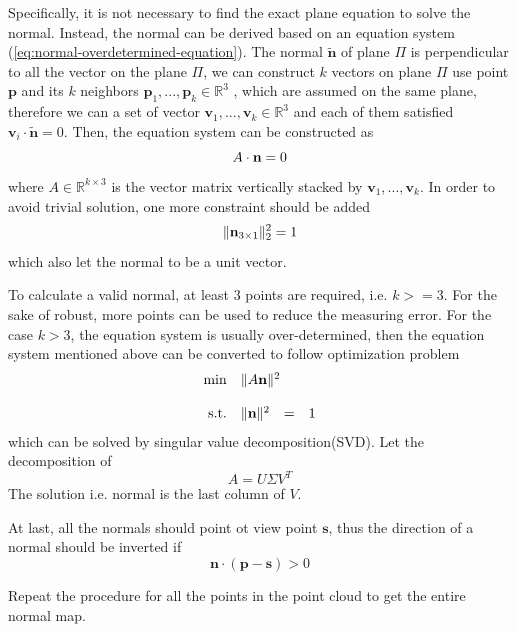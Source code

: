 Specifically, it is not necessary to find the exact plane equation to solve the normal. Instead, the normal can be derived based on an equation system (\ref{eq:normal-overdetermined-equation}). The normal $ \tilde{\textbf{n}} $ of plane $ \Pi $ is perpendicular to all the vector on the plane $ \Pi $, we can construct $ k $ vectors on plane $ \Pi $ use point $ \textbf{p} $ and its $ k $ neighbors $ \textbf{p}_1, ..., \textbf{p}_k \in \mathbb{R}^3 $ , which are assumed on the same plane, therefore we can a set of vector $ \textbf{v}_1, ..., \textbf{v}_k \in \mathbb{R}^3 $ and each of them satisfied $ \textbf{v}_i \cdot \tilde{\textbf{n}} = 0$. Then, the equation system can be constructed as 
\begin{equation}{\label{eq:normal-overdetermined-equation}}
	A \cdot \textbf{n} = 0
\end{equation}
where $ A \in \mathbb{R}^{k\times 3} $ is the vector matrix vertically stacked by $ \textbf{v}_1, ..., \textbf{v}_k $.
In order to avoid trivial solution, one more constraint should be added
\[ \|  \textbf{n}_{3 \times 1} \|_2^2 = 1  \]
which also let the normal to be a unit vector.

To calculate a valid normal, at least 3 points are required, i.e. $ k>=3 $. For the sake of robust, more points can be used to reduce the measuring error. For the case $ k>3 $, the equation system is usually over-determined, then the equation system mentioned above can be converted to follow optimization problem
\begin{equation}
	\begin{array}{rrclcl}
		\displaystyle \min & \multicolumn{3}{l}{\| A  \bn \|^2} \\
		\\
		\textrm{s.t.} & \| \bn \|^2 & = & 1 
	\end{array}
\end{equation}
which can be solved by singular value decomposition(SVD). Let the decomposition of 
\[ A=U\Sigma V^T \]
The solution i.e. normal is the last column of $ V $.


At last, all the normals should point ot view point $ \textbf{s} $, thus the direction of a normal should be inverted if 
\begin{equation}\label{eq:normal-invertion}
	\textbf{n} \cdot (\textbf{p}  - \textbf{s}) > 0
\end{equation}

Repeat the procedure for all the points in the point cloud to get the entire normal map. 

